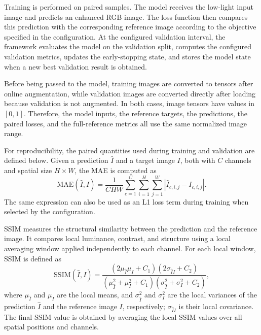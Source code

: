 Training is performed on paired samples. The model receives the low-light input image and predicts an enhanced RGB image. The loss function then compares this prediction with the corresponding reference image according to the objective specified in the configuration. At the configured validation interval, the framework evaluates the model on the validation split, computes the configured validation metrics, updates the early-stopping state, and stores the model state when a new best validation result is obtained.

Before being passed to the model, training images are converted to tensors after online augmentation, while validation images are converted directly after loading because validation is not augmented. In both cases, image tensors have values in $[0,1]$. Therefore, the model inputs, the reference targets, the predictions, the paired losses, and the full-reference metrics all use the same normalized image range.

For reproducibility, the paired quantities used during training and validation are defined below. Given a prediction $\hat{I}$ and a target image $I$, both with $C$ channels and spatial size $H \times W$, the MAE is computed as
\begin{equation}
	\mathrm{MAE}(\hat{I}, I)
	=
	\frac{1}{CHW}
	\sum_{c=1}^{C}
	\sum_{i=1}^{H}
	\sum_{j=1}^{W}
	\left|
	\hat{I}_{c,i,j} - I_{c,i,j}
	\right|.
	\label{eq:mae}
\end{equation}
The same expression can also be used as an L1 loss term during training when selected by the configuration.

SSIM measures the structural similarity between the prediction and the reference image. It compares local luminance, contrast, and structure using a local averaging window applied independently to each channel. For each local window, SSIM is defined as
\begin{equation}
	\mathrm{SSIM}(\hat{I}, I)
	=
	\frac{
		(2\mu_{\hat{I}}\mu_I + C_1)
		(2\sigma_{\hat{I}I} + C_2)
	}{
		(\mu_{\hat{I}}^2 + \mu_I^2 + C_1)
		(\sigma_{\hat{I}}^2 + \sigma_I^2 + C_2)
	},
	\label{eq:ssim}
\end{equation}
where $\mu_{\hat{I}}$ and $\mu_I$ are the local means, and $\sigma_{\hat{I}}^2$ and $\sigma_I^2$ are the local variances of the prediction $\hat{I}$ and the reference image $I$, respectively; $\sigma_{\hat{I}I}$ is their local covariance. The final SSIM value is obtained by averaging the local SSIM values over all spatial positions and channels.


